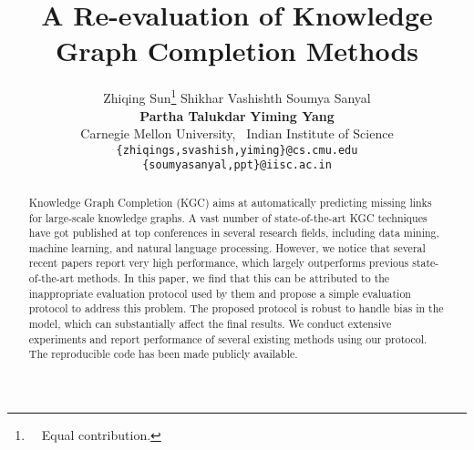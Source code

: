 \documentclass[11pt,a4paper]{article}
\title{
A Re-evaluation of Knowledge Graph Completion Methods
}
\author{Zhiqing Sun\thanks{\ \ Equal contribution.} \quad Shikhar Vashishth \quad Soumya Sanyal  \\ \textbf{Partha Talukdar} \quad 	\textbf{Yiming Yang}\\
	 Carnegie Mellon University, \
	 Indian Institute of Science\\
	{\tt \small \{zhiqings,svashish,yiming\}@cs.cmu.edu} \\
	{\tt \small \{soumyasanyal,ppt\}@iisc.ac.in} \\
}
\date{}
\begin{document}
\maketitle

 \newcommand{\refalg}[1]{Algorithm \ref{#1}}
\newcommand{\refeqn}[1]{Equation \ref{#1}}
\newcommand{\reffig}[1]{Figure \ref{#1}}
\newcommand{\reftbl}[1]{Table \ref{#1}}
\newcommand{\refsec}[1]{Section \ref{#1}}


\newcommand{\datafb}{FB15k-237}
\newcommand{\datawn}{WN18RR}
\newcommand{\datayago}{YAGO3-10}

\newcommand{\reminder}[1]{\textcolor{red}{[[ #1 ]]}\typeout{#1}}
\newcommand{\reminderR}[1]{\textcolor{gray}{[[ #1 ]]}\typeout{#1}}

\newcommand{\add}[1]{\textcolor{red}{#1}\typeout{#1}}
\newcommand{\remove}[1]{\sout{#1}\typeout{#1}}

\newcommand{\m}[1]{\mathcal{#1}}
\newcommand{\method}{SynGCN}
\newcommand{\methods}{WG}
\newcommand{\methodside}{SemGCN}
\newcommand{\methodsyn}{SynGCN}
\newcommand{\methodsidefull}{Semantic-GCN}
\newcommand{\methodsynfull}{Syntactic-GCN}

\newcommand{\problem}{DD}
\newcommand{\problemfull}{Document Dating}



\newcommand{\tensor}{\mathcal{X}}
\newcommand{\real}{\mathbb{R}}

\newcommand{\tuples}{\mathbb{T}}

\newcommand{\argmax}{arg\,max}

\newcommand\norm[1]{\left\lVert#1\right\rVert}

\newcommand{\note}[1]{\textcolor{blue}{#1}}

\newcommand*{\Scale}[2][4]{\scalebox{#1}{}}\newcommand*{\Resize}[2]{\resizebox{#1}{!}{}}
\def\mat#1{\mbox{\bf #1}}

\theoremstyle{definition}
\newtheorem{definition}{Definition}[section]

\newtheorem{proposition}{Proposition}[section]
\newtheorem*{lemma*}{Lemma}


 
\begin{abstract}
Knowledge Graph Completion (KGC) aims at automatically predicting missing links for large-scale knowledge graphs. A vast number of state-of-the-art KGC techniques have got published at top conferences in several research fields, including data mining, machine learning, and natural language processing. However, we notice that several recent papers report very high performance, which largely outperforms previous state-of-the-art methods. 
In this paper, we find that this can be attributed to the inappropriate evaluation protocol used by them and propose a simple evaluation protocol to address this problem. The proposed protocol is robust to handle bias in the model, which can substantially affect the final results.
We conduct extensive experiments and report performance of several existing methods using our protocol. The reproducible code has been made publicly available.
\end{abstract}
\end{document}
